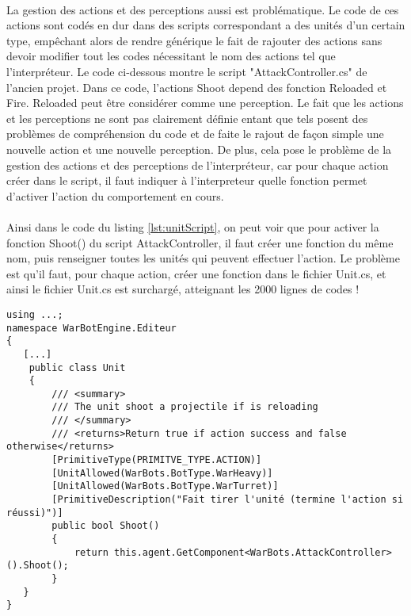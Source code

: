 \documentclass{report}
\begin{document}
\paragraph{} La gestion des actions et des perceptions aussi est problématique. Le code de ces actions sont codés en dur dans des scripts correspondant a des unités d'un certain type, empêchant alors de rendre générique le fait de rajouter des actions sans devoir modifier tout les codes nécessitant le nom des actions tel que l’interpréteur. Le code ci-dessous montre le script "AttackController.cs" de l'ancien projet. Dans ce code, l'actions Shoot depend des fonction Reloaded et Fire. Reloaded peut être considérer comme une perception. Le fait que les actions et les perceptions ne sont pas clairement définie entant que tels posent des problèmes de compréhension du code et de faite le rajout de façon simple une nouvelle action et une nouvelle perception. De plus, cela pose le problème de la gestion des actions et des perceptions de l’interpréteur, car pour chaque action créer dans le script, il faut indiquer à l'interpreteur quelle fonction permet d'activer l'action du comportement en cours. 
\paragraph{}Ainsi dans le code du listing \ref{lst:unitScript}, on peut voir que pour activer la fonction Shoot() du script AttackController, il faut créer une fonction du même nom, puis renseigner toutes les unités qui peuvent effectuer l'action. Le problème est qu'il faut, pour chaque action, créer une fonction dans le fichier Unit.cs, et ainsi le fichier Unit.cs est surchargé, atteignant les 2000 lignes de codes !

\begin{lstlisting}[language={[Sharp]C},label={lst:unitScript}, caption=  Extrait du code du script Unit.cs]
using ...;
namespace WarBotEngine.Editeur
{
   [...]
	public class Unit
    {
        /// <summary>
        /// The unit shoot a projectile if is reloading
        /// </summary>
        /// <returns>Return true if action success and false otherwise</returns>
        [PrimitiveType(PRIMITVE_TYPE.ACTION)]
        [UnitAllowed(WarBots.BotType.WarHeavy)]
        [UnitAllowed(WarBots.BotType.WarTurret)]
        [PrimitiveDescription("Fait tirer l'unité (termine l'action si réussi)")]
        public bool Shoot()
        {
            return this.agent.GetComponent<WarBots.AttackController>().Shoot();
        }
   }
}

\end{lstlisting}
\end{document}
